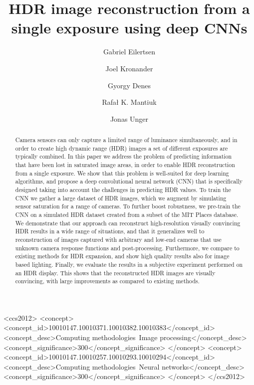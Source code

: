 \documentclass[acmtog]{acmart}
\begin{document}
\title{HDR image reconstruction from a single exposure using deep CNNs}

\author{Gabriel Eilertsen}

\author{Joel Kronander}

\author{Gyorgy Denes}

\author{Rafa{\l} K. Mantiuk}

\author{Jonas Unger}

\renewcommand{\shortauthors}{G. Eilertsen, J. Kronander, G. Denes, R. K. Mantiuk and J. Unger}

\begin{abstract}
Camera sensors can only capture a limited range of luminance simultaneously, and in order to create high dynamic range (HDR) images a set of different exposures are typically combined. In this paper we address the problem of predicting information that have been lost in saturated image areas, in order to enable HDR reconstruction from a single exposure. We show that this problem is well-suited for deep learning algorithms, and propose  a deep convolutional neural network (CNN) that is specifically designed taking into account the challenges in predicting HDR values. To train the CNN we gather a large dataset of HDR images, which we augment by simulating sensor saturation for a range of cameras. To further boost robustness, we pre-train the CNN on a simulated HDR dataset created from a subset of the MIT Places database.
We demonstrate that our approach can reconstruct high-resolution visually convincing HDR results in a wide range of situations, and that it generalizes well to reconstruction of images captured with arbitrary and low-end cameras that use unknown camera response functions and post-processing. 
Furthermore, we compare to existing methods for HDR expansion, and show high quality results also for image based lighting.
Finally, we evaluate the results in a subjective experiment performed on an HDR display. This shows that the reconstructed HDR images are visually convincing, with large improvements as compared to existing methods.
\end{abstract}

 \begin{CCSXML}
<ccs2012>
 <concept>
  <concept_id>10010147.10010371.10010382.10010383</concept_id>
  <concept_desc>Computing methodologies~Image processing</concept_desc>
  <concept_significance>300</concept_significance>
 </concept>
 <concept>
  <concept_id>10010147.10010257.10010293.10010294</concept_id>
  <concept_desc>Computing methodologies~Neural networks</concept_desc>
  <concept_significance>300</concept_significance>
 </concept>
</ccs2012>
\end{CCSXML}
 
\end{document}
